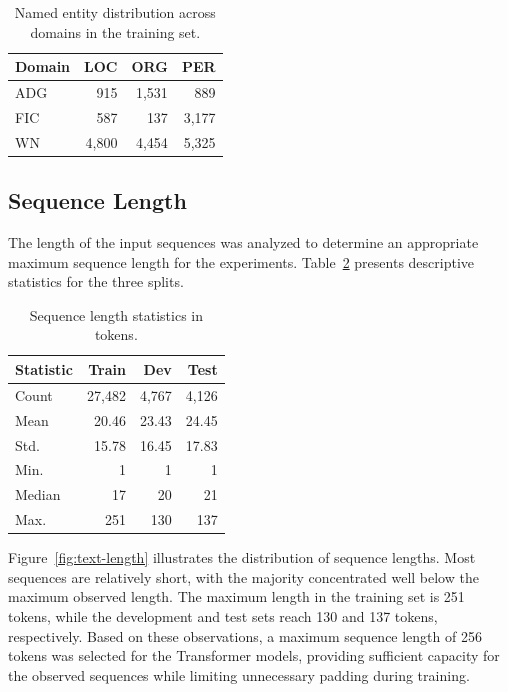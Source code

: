 \begin{table}[H]
    \centering
    \caption{Named entity distribution across domains in the training set.}
    \label{tab:entity-domain}
    \begin{tabular}{lrrr}
        \hline
        \textbf{Domain} & \textbf{LOC} & \textbf{ORG} & \textbf{PER} \\
        \hline
        ADG & 915  & 1,531 & 889 \\
        FIC & 587  & 137   & 3,177 \\
        WN  & 4,800 & 4,454 & 5,325 \\
        \hline
    \end{tabular}
\end{table}

\subsection{Sequence Length}
\label{subsec:eda-length}

The length of the input sequences was analyzed to determine an appropriate maximum sequence length for the experiments. Table~\ref{tab:sequence-length} presents descriptive statistics for the three splits.

\begin{table}[H]
    \centering
    \caption{Sequence length statistics in tokens.}
    \label{tab:sequence-length}
    \begin{tabular}{lrrr}
        \hline
        \textbf{Statistic} & \textbf{Train} & \textbf{Dev} & \textbf{Test} \\
        \hline
        Count  & 27,482 & 4,767 & 4,126 \\
        Mean   & 20.46 & 23.43 & 24.45 \\
        Std.   & 15.78 & 16.45 & 17.83 \\
        Min.   & 1 & 1 & 1 \\
        Median & 17 & 20 & 21 \\
        Max.   & 251 & 130 & 137 \\
        \hline
    \end{tabular}
\end{table}

Figure~\ref{fig:text-length} illustrates the distribution of sequence lengths. Most sequences are relatively short, with the majority concentrated well below the maximum observed length. The maximum length in the training set is 251 tokens, while the development and test sets reach 130 and 137 tokens, respectively. Based on these observations, a maximum sequence length of 256 tokens was selected for the Transformer models, providing sufficient capacity for the observed sequences while limiting unnecessary padding during training.

